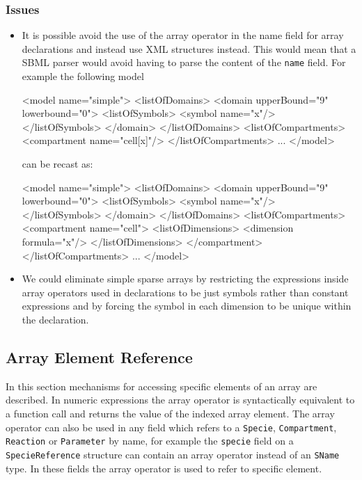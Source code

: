\documentclass{cekarticle}
\begin{document}
\subsubsection{Issues}
\begin{itemize}
\item
It is possible avoid the use of the array operator in the name
field for array declarations and instead use XML structures
instead.  This would mean that a SBML parser would avoid having
to parse the content of the \texttt{name} field.  For example the
following model
\begin{example}
<model name="simple">
    <listOfDomains>
        <domain upperBound="9" lowerbound="0">
            <listOfSymbols>
                <symbol name="x"/>
            </listOfSymbols>
        </domain>
    </listOfDomains>
    <listOfCompartments>
        <compartment name="cell[x]"/>
    </listOfCompartments>
    ...
</model>
\end{example}
can be recast as:
\begin{example}
<model name="simple">
    <listOfDomains>
        <domain upperBound="9" lowerbound="0">
            <listOfSymbols>
                <symbol name="x"/>
            </listOfSymbols>
        </domain>
    </listOfDomains>
    <listOfCompartments>
        <compartment name="cell">
            <listOfDimensions>
                <dimension formula="x"/>
            </listOfDimensions>
        </compartment>
    </listOfCompartments>
    ...
</model>
\end{example}

\item
We could eliminate simple sparse arrays by restricting the
expressions inside array operators used in declarations to be
just symbols rather than constant expressions and by forcing the
symbol in each dimension to be unique within the declaration.
\end{itemize}

\subsection{Array Element Reference}
In this section mechanisms for accessing specific elements of an
array are described. In numeric expressions the array operator is
syntactically equivalent to a function call and returns the value
of the indexed array element. The array operator can also be used
in any field which refers to a \texttt{Specie},
\texttt{Compartment}, \texttt{Reaction} or \texttt{Parameter} by
name, for example the \texttt{specie} field on a
\texttt{SpecieReference} structure can contain an array operator
instead of an \texttt{SName} type.  In these fields the array
operator is used to refer to specific element.
\end{document}

